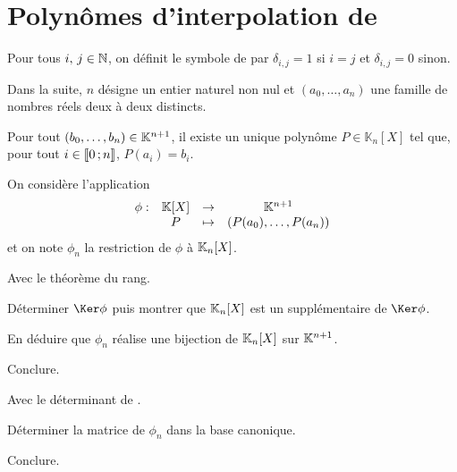 \section{Polynômes d'interpolation de }

Pour tous $i,\, j \in \mathbb{N}$, on définit le symbole de  par $\delta_{i,j} = 1$ si $i = j$ et $\delta_{i,j} = 0$ sinon.

Dans la suite, $n$ désigne un entier naturel non nul et $(a_0, \ldots, a_n)$ une famille de nombres réels deux à deux distincts.

\begin{defi}
Pour tout $(b_0,\ldots,b_n) \in \mathbb{K}^{n+1}$, il existe un unique polynôme $P \in \mathbb{K}_n[X]$ tel que, pour tout $i \in \llbracket 0\,; n \rrbracket$, $P(a_i) = b_i$.
\end{defi}


\begin{exercice}
On considère l'application
\[
\begin{array}{lccc}
\phi : & \mathbb{K}[X] &\to& \mathbb{K}^{n+1}\\
&P&\mapsto&(P(a_0),\ldots,P(a_n))
\end{array}
\]
et on note $\phi_n$ la restriction de $\phi$ à $\mathbb{K}_n[X]$.
\begin{questions}
\item Avec le théorème du rang.
\begin{questions}
\item Déterminer $\Ker \phi$ puis montrer que $\mathbb{K}_n[X]$ est un supplémentaire de $\Ker \phi$.

\item En déduire que $\phi_n$ réalise une bijection de $\mathbb{K}_n[X]$ sur $\mathbb{K}^{n+1}$.

\item Conclure.
\end{questions}

\item Avec le déterminant de .
\begin{questions}
\item Déterminer la matrice de $\phi_n$ dans la base canonique.

\item Conclure.
\end{questions}
\end{questions}
\end{exercice}


